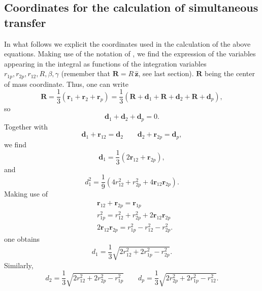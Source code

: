 \subsection{Coordinates for the calculation of simultaneous transfer}\label{csc}
In what follows we explicit the coordinates used in the calculation of the above equations. Making use of the notation of \cite{Bayman:71}, we find the expression of the variables appearing in the integral as functions of the integration variables $r_{1p},r_{2p},r_{12},R,\beta,\gamma$ (remember that $\mathbf{R}=R\,\hat{\mathbf{z}}$, see last section). $\mathbf{R}$ being the center of mass coordinate. Thus, one can write
\begin{equation}\label{eq65}
    \mathbf{R} =\frac{1}{3}\left(\mathbf{r}_1+ \mathbf{r}_2+ \mathbf{r}_p\right)=\frac{1}{3}\left(\mathbf{R}+ \mathbf{d}_1+ \mathbf{R}+ \mathbf{d}_2+ \mathbf{R}+ \mathbf{d}_p\right),
\end{equation}
so
\begin{equation}\label{eq66}
     \mathbf{d}_1+ \mathbf{d}_2+ \mathbf{d}_p=0.
\end{equation}
Together with
\begin{equation}\label{eq67}
   \mathbf{d}_1+\mathbf{r}_{12}=\mathbf{d}_2 \qquad \mathbf{d}_2+ \mathbf{r}_{2p}=\mathbf{d}_p,
\end{equation}
we find
\begin{equation}\label{eq68}
   \mathbf{d}_1 =\frac{1}{3}\left(2\mathbf{r}_{12}+\mathbf{r}_{2p}\right),
\end{equation}
and
\begin{equation}\label{eq69}
    d_1^2 =\frac{1}{9}\left(4 r_{12}^2+r_{2p}^2+4\mathbf{r}_{12}\mathbf{r}_{2p}\right).
\end{equation}
Making use of
\begin{equation}\label{eq70}
\begin{split}
&\mathbf{r}_{12}+\mathbf{r}_{2p}=\mathbf{r}_{1p}\\
&r_{1p}^2=r_{12}^2+r_{2p}^2+2\mathbf{r}_{12}\mathbf{r}_{2p}\\
&2\mathbf{r}_{12}\mathbf{r}_{2p}=r_{1p}^2-r_{12}^2-r_{2p}^2.
\end{split}
\end{equation}
one obtains
\begin{equation}\label{eq71}
    d_1=\frac{1}{3}\sqrt{2r_{12}^2+2r_{1p}^2-r_{2p}^2}.
\end{equation}
Similarly,
\begin{equation}\label{eq72}
    d_2=\frac{1}{3}\sqrt{2r_{12}^2+2r_{2p}^2-r_{1p}^2}\qquad d_p=\frac{1}{3}\sqrt{2r_{2p}^2+2r_{1p}^2-r_{12}^2}.
\end{equation}

